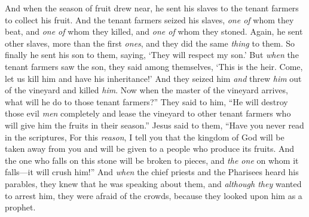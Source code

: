 \begin{biblechapter}
\verse And when the season of fruit drew near, he sent his slaves to the tenant farmers to collect his fruit.
\verse And the tenant farmers seized his slaves, \textit{one of} whom they beat, and \textit{one of} whom they killed, and \textit{one of} whom they stoned.
\verse Again, he sent other slaves, more than the first \textit{ones}, and they did the same \textit{thing} to them.
\verse So finally he sent his son to them, saying, ‘They will respect my son.’
\verse But \textit{when} the tenant farmers saw the son, they said among themselves, ‘This is the heir. Come, let us kill him and have his inheritance!’
\verse And they seized him \textit{and} threw \textit{him} out of the vineyard and killed \textit{him}.
\verse Now when the master of the vineyard arrives, what will he do to those tenant farmers?”
\verse They said to him, “He will destroy those evil \textit{men} completely and lease the vineyard to other tenant farmers who will give him the fruits in their season.”
\verse Jesus said to them, “Have you never read in the scriptures,
\verse For this \textit{reason}, I tell you that the kingdom of God will be taken away from you and will be given to a people who produce its fruits.
\verse And the one who falls on this stone will be broken to pieces, and \textit{the one} on whom it falls—it will crush him!”
\verse And \textit{when} the chief priests and the Pharisees heard his parables, they knew that he was speaking about them,
\verse and \textit{although they} wanted to arrest him, they were afraid of the crowds, because they looked upon him as a prophet.
\end{biblechapter}

